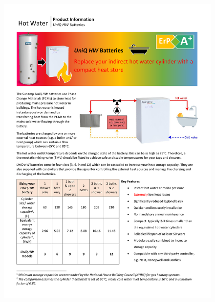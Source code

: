 \begin{figure}
	\centering
	\includegraphics[height=\textheight]{Appendices/1_PIS_HW.pdf}
\end{figure}